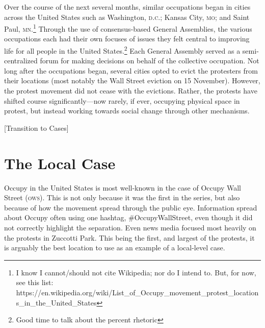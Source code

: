 \documentclass{article}
\begin{document}
Over the course of the next several months, similar occupations began in cities across the United States such as Washington, \textsc{d.c.}; Kansas City, \textsc{mo}; and Saint Paul, \textsc{mn}.\footnote{I know I cannot/should not cite Wikipedia; nor do I intend to. But, for now, see this list: https://en.wikipedia.org/wiki/List\_of\_Occupy\_movement\_protest\_locations\_in\_the\_United\_States}
Through the use of consensus-based General Assemblies, the various occupations each had their own focuses of issues they felt central to improving life for all people in the United States.\footnote{Good time to talk about the  percent rhetoric}
Each General Assembly served as a semi-centralized forum for making decisions on behalf of the collective occupation.
Not long after the occupations began, several cities opted to evict the protesters from their locations (most notably the Wall Street eviction on 15 November).
However, the protest movement did not cease with the evictions.
Rather, the protests have shifted course significantly---now rarely, if ever, occupying physical space in protest, but instead working towards social change through other mechanisms.

[Transition to Cases]

\section{The Local Case}
Occupy in the United States is most well-known in the case of Occupy Wall Street (\textsc{ows}).
This is not only because it was the first in the series, but also because of how the movement spread through the public eye.
Information spread about Occupy often using one hashtag, \#OccupyWallStreet, even though it did not correctly highlight the separation.
Even news media focused most heavily on the protests in Zuccotti Park.
This being the first, and largest of the protests, it is arguably the best location to use as an example of a local-level case.
\end{document}
